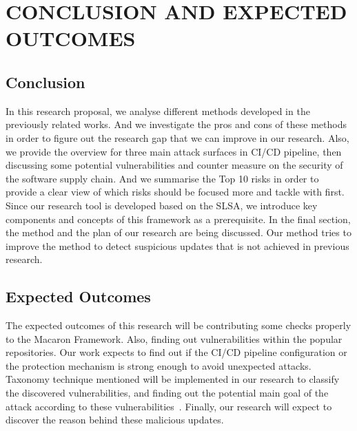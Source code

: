 \section{CONCLUSION AND EXPECTED OUTCOMES}
\subsection{Conclusion}
In this research proposal, we analyse different methods developed in the previously related works.
And we investigate the pros and cons of these methods in order to figure out the research gap that 
we can improve in our research. Also, we provide the overview for three main attack surfaces in CI/CD
pipeline, then discussing some potential vulnerabilities and counter measure on the security of the software
supply chain. And we summarise the Top 10 risks in order to provide a clear view of which risks should
be focused more and tackle with first. 
Since our research tool is developed based on the SLSA, we introduce key components and concepts of this 
framework as a prerequisite.
In the final section, the method and the plan of our research are being discussed. Our method tries to 
improve the method to detect suspicious updates that is not achieved in previous research.
\subsection{Expected Outcomes}
The expected outcomes of this research will be contributing some checks properly to the Macaron 
Framework. Also, finding out vulnerabilities within the popular repositories. Our work expects to 
find out if the CI/CD pipeline configuration or the protection mechanism is strong enough to 
avoid unexpected attacks. Taxonomy technique mentioned will be 
implemented in our research to classify the discovered vulnerabilities, and finding out the potential
main goal of the attack according to these vulnerabilities~\cite{ohm2020backstabber}. Finally, our research will expect to 
discover the reason behind these malicious updates.   